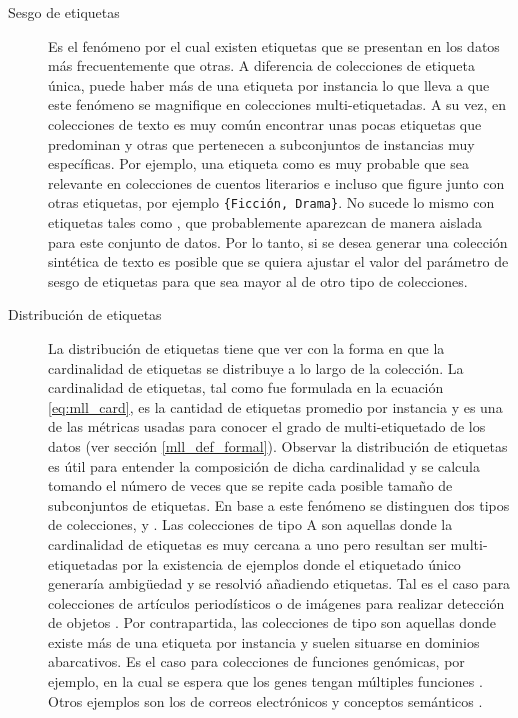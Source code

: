 \begin{description}

   \item[Sesgo de etiquetas] Es el fenómeno por el cual existen etiquetas que se
      presentan en los datos más frecuentemente que otras. A diferencia de
      colecciones de etiqueta única, puede haber más de una etiqueta por
      instancia lo que lleva a que este fenómeno se magnifique en colecciones
      multi-etiquetadas. A su vez, en colecciones de texto es muy común
      encontrar unas pocas etiquetas que predominan y otras que pertenecen a
      subconjuntos de instancias muy específicas. Por ejemplo, una etiqueta como
       es muy probable que sea relevante en
      colecciones de cuentos literarios e incluso que figure junto con otras
      etiquetas, por ejemplo \texttt{\{Ficción, Drama\}}.  No sucede lo mismo
      con etiquetas tales como , que probablemente
      aparezcan de manera aislada para este conjunto de datos.  Por lo tanto, si
      se desea generar una colección sintética de texto es posible que se quiera
      ajustar el valor del parámetro de sesgo de etiquetas para que sea mayor al
      de otro tipo de colecciones.

   \item[Distribución de etiquetas] La distribución de etiquetas tiene que ver
      con la forma en que la cardinalidad de etiquetas se distribuye a lo largo
      de la colección. La cardinalidad de etiquetas, tal como fue formulada en
      la ecuación \ref{eq:mll_card}, es la cantidad de etiquetas promedio por
      instancia y es una de las métricas usadas para conocer el grado de
      multi-etiquetado de los datos (ver sección \ref{mll_def_formal}). Observar
      la distribución de etiquetas es útil para entender la composición de dicha
      cardinalidad y se calcula tomando el número de veces que se repite cada
      posible tamaño de subconjuntos de etiquetas. En base a este fenómeno se
      distinguen dos tipos de colecciones,  y . Las
      colecciones de tipo A son aquellas donde la cardinalidad de etiquetas es
      muy cercana a uno pero resultan ser multi-etiquetadas por la existencia de
      ejemplos donde el etiquetado único generaría ambigüedad y se resolvió
      añadiendo etiquetas. Tal es el caso para colecciones de artículos
      periodísticos \cite{lang_newsweeder_2008} o de imágenes para realizar
      detección de objetos \cite{boutell_learning_2004}. Por contrapartida, las
      colecciones de tipo  son aquellas donde existe más de una
      etiqueta por instancia y suelen situarse en dominios abarcativos. Es el
      caso para colecciones de funciones genómicas, por ejemplo, en la cual se
      espera que los genes tengan múltiples funciones
      \cite{diplaris_protein_2005}.  Otros ejemplos son los de correos
      electrónicos \cite{hutchison_enron_2004} y conceptos semánticos
      \cite{snoek_challenge_2006}.


\end{description}
